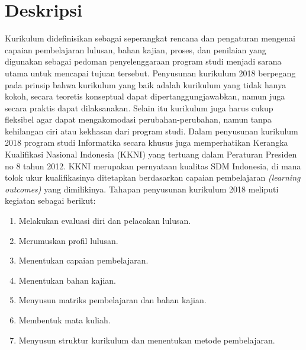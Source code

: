 \documentclass[a4paper,twoside]{article}
\begin{document}
\title{\@judultopik}
\author{\nama \textendash \@npm} 

\newcommand{\nama}{Muhammad Taufik Adianto}
\newcommand{\@npm}{2012730089}
\newcommand{\@judultopik}{Pemodelan Kuliah Kurikulum 2018 Dalam Format JSON} %
\newcommand{\jumpemb}{1} %
\newcommand{\tanggal}{13/02/2018}
\maketitle


\section{Deskripsi}
Kurikulum didefinisikan sebagai seperangkat rencana dan pengaturan mengenai capaian pembelajaran 
lulusan, bahan kajian, proses, dan penilaian yang digunakan sebagai pedoman penyelenggaraan program studi menjadi sarana utama untuk mencapai tujuan tersebut. Penyusunan kurikulum 2018 berpegang pada prinsip bahwa 
kurikulum yang baik adalah kurikulum yang tidak hanya kokoh, secara teoretis konseptual dapat dipertanggungjawabkan, namun juga secara praktis dapat dilaksanakan. Selain itu kurikulum juga harus cukup fleksibel agar dapat mengakomodasi perubahan-perubahan, namun tanpa kehilangan ciri atau kekhasan dari program studi. Dalam penyusunan kurikulum 2018 program studi Informatika secara khusus juga memperhatikan Kerangka Kualifikasi Nasional Indonesia (KKNI) yang tertuang dalam Peraturan Presiden no 8 tahun 2012. KKNI merupakan pernyataan kualitas SDM Indonesia, di mana tolok ukur kualifikasinya ditetapkan berdasarkan capaian 
pembelajaran \textit{(learning outcomes)} yang dimilikinya. Tahapan penyusunan kurikulum 2018 meliputi kegiatan sebagai berikut: 
\begin{enumerate}
\item Melakukan evaluasi diri dan pelacakan lulusan.
\item Merumuskan profil lulusan.
\item Menentukan capaian pembelajaran.
\item Menentukan bahan kajian.
\item Menyusun matriks pembelajaran dan bahan kajian.
\item Membentuk mata kuliah.
\item Menyusun struktur kurikulum dan menentukan metode pembelajaran.
\end{enumerate}
\end{document}
